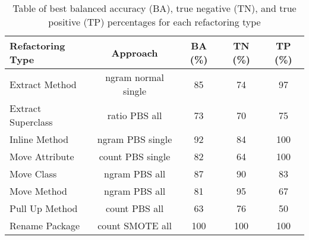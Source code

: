 \begin{table*}
    \begin{tabular}{lcccc}
    \toprule
    Refactoring Type & Approach & BA (\%) & TN (\%) & TP (\%) \\
    \midrule
        Extract Method & ngram normal single & 85 & 74 & 97 \\
    Extract Superclass & ratio PBS all & 73 & 70 & 75 \\
    Inline Method & ngram PBS single & 92 & 84 & 100 \\
    Move Attribute & count PBS single & 82 & 64 & 100 \\
    Move Class & ngram PBS all & 87 & 90 & 83 \\
    Move Method & ngram PBS all & 81 & 95 & 67 \\
    Pull Up Method & count PBS all & 63 & 76 & 50 \\
    Rename Package & count SMOTE all & 100 & 100 & 100 \\
    \bottomrule
    \end{tabular}
    \caption{Table of best balanced accuracy (BA), true negative (TN), and true positive (TP) percentages for each refactoring type}
    \label{tab:refactoring_best_accuracy}
\end{table*}
    
